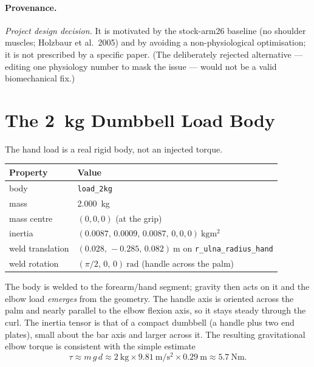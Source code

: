 \documentclass[11pt]{article}
\begin{document}
\paragraph{Provenance.} \textit{Project design decision.} It is motivated by the
stock-arm26 baseline (no shoulder muscles; Holzbaur et al.\ 2005) and by avoiding
a non-physiological optimisation; it is not prescribed by a specific paper. (The
deliberately rejected alternative --- editing one physiology number to mask the
issue --- would not be a valid biomechanical fix.)

\section{The \SI{2}{\kilogram} Dumbbell Load Body}
\label{sec:load}

The hand load is a real rigid body, not an injected torque.

\begin{table}[h]
\centering
\begin{tabular}{ll}
\toprule
\textbf{Property} & \textbf{Value} \\
\midrule
body & \texttt{load\_2kg} \\
mass & \SI{2.000}{\kilogram} \\
mass centre & $(0,0,0)$ (at the grip) \\
inertia & $(0.0087,\,0.0009,\,0.0087,\,0,0,0)\ \si{\kilogram\meter\squared}$ \\
weld translation & $(0.028,\,-0.285,\,0.082)\ \si{\meter}$ on \texttt{r\_ulna\_radius\_hand} \\
weld rotation & $(\pi/2,\,0,\,0)\ \si{\radian}$ (handle across the palm) \\
\bottomrule
\end{tabular}
\end{table}

The body is welded to the forearm/hand segment; gravity then acts on it and the
elbow load \emph{emerges} from the geometry. The handle axis is oriented across
the palm and nearly parallel to the elbow flexion axis, so it stays steady
through the curl. The inertia tensor is that of a compact dumbbell (a handle plus
two end plates), small about the bar axis and larger across it. The resulting
gravitational elbow torque is consistent with the simple estimate
\[
\tau \approx m\,g\,d \approx \SI{2}{\kilogram}\times\SI{9.81}{\meter\per\second\squared}\times\SI{0.29}{\meter}
\approx \SI{5.7}{\newton\meter}.
\]
\end{document}
